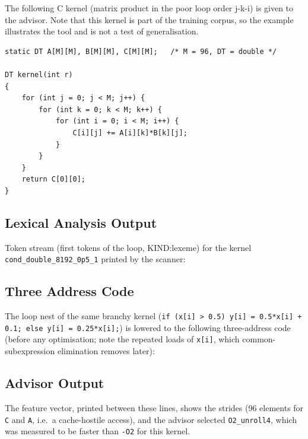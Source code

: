 \documentclass[12pt,a4paper]{article}
\begin{document}
The following C kernel (matrix product in the poor loop order j-k-i) is given to the advisor.
Note that this kernel is part of the training corpus, so the example illustrates the
tool and is not a test of generalisation.

\begin{lstlisting}
static DT A[M][M], B[M][M], C[M][M];   /* M = 96, DT = double */

DT kernel(int r)
{
    for (int j = 0; j < M; j++) {
        for (int k = 0; k < M; k++) {
            for (int i = 0; i < M; i++) {
                C[i][j] += A[i][k]*B[k][j];
            }
        }
    }
    return C[0][0];
}
\end{lstlisting}

\subsection{Lexical Analysis Output}

Token stream (first tokens of the loop, KIND:lexeme) for the kernel \texttt{cond\_double\_8192\_0p5\_1} printed by the scanner:



\subsection{Three Address Code}

The loop nest of the same branchy kernel
(\texttt{if (x[i] > 0.5) y[i] = 0.5*x[i] + 0.1; else y[i] = 0.25*x[i];}) is lowered to the following
three-address code (before any optimisation; note the repeated loads of \texttt{x[i]}, which
common-subexpression elimination removes later):



\subsection{Advisor Output}




The feature vector, printed between these lines, shows the strides (96 elements for \texttt{C} and
\texttt{A}, i.e.\ a cache-hostile access), and the advisor selected \texttt{O2\_unroll4}, which was measured to be
faster than \texttt{-O2} for this kernel.
\end{document}
